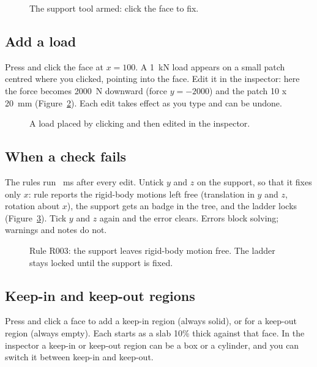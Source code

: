 \begin{figure}[t]
\caption{The support tool armed: click the face to fix.}
\label{fig:supporttool}
\end{figure}

\subsection{Add a load}
Press  and click the face at $x = 100$. A 1~kN load appears on a small patch centred where you clicked,
pointing into the face. Edit it in the inspector: here the force becomes 2000~N downward (force $y = -2000$) and the
patch 10 x 20~mm (Figure~\ref{fig:loadinspector}). Each edit takes effect as you type and can be undone.

\begin{figure}[t]
\caption{A load placed by clicking and then edited in the inspector.}
\label{fig:loadinspector}
\end{figure}

\subsection{When a check fails}
The rules run \CheckDelay~ms after every edit. Untick $y$ and $z$ on the support, so that it fixes only $x$: rule
 reports the rigid-body motions left free (translation in $y$ and $z$, rotation about $x$), the support gets
an  badge in the tree, and the ladder locks (Figure~\ref{fig:ruleerror}). Tick $y$ and $z$ again and the error
clears. Errors block solving; warnings and notes do not.

\begin{figure}[t]
\centering
{}
\caption{Rule R003: the support leaves rigid-body motion free. The ladder stays locked until the support is fixed.}
\label{fig:ruleerror}
\end{figure}

\subsection{Keep-in and keep-out regions}
Press  and click a face to add a keep-in region (always solid), or  for a keep-out region (always
empty). Each starts as a slab 10\% thick against that face. In the inspector a keep-in or keep-out region can be a box
or a cylinder, and you can switch it between keep-in and keep-out.

